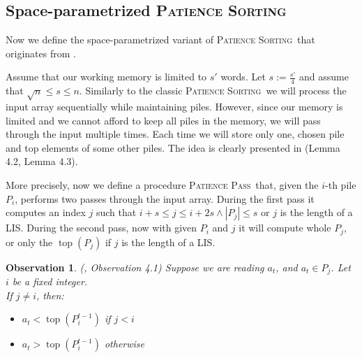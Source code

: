 \documentclass[lic, english, shortabstract]{iithesis}
\theoremstyle{plain}
\newcommand{\Lis}{\textsc{LIS}}
\newcommand{\Psort}{\textsc{Patience Sorting}}
\newcommand{\Ppass}{\textsc{Patience Pass}}
\newtheorem{observation}[theorem]{Observation}
\theoremstyle{definition}
\begin{document}
\subsection{Space-parametrized \Psort}
Now we define the space-parametrized variant of \Psort\ that originates from \cite{kiyomi2017space}.

Assume that our working memory is limited to $s'$ words. Let $s := \frac{s'}{4}$ and assume that $\sqrt{n} \leq s \leq n$.
Similarly to the classic \Psort\ we will process the input array sequentially while maintaining piles. However, since our memory is limited and we cannot afford
to keep all piles in the memory, we will pass through the input multiple times. Each time we will store only one, chosen pile and top elements of some other piles. The idea is clearly presented in \cite{kiyomi2017space} (Lemma 4.2, Lemma 4.3).

More precisely, now we define a procedure \Ppass\ that, given the $i$-th pile $P_i$, performs two passes through the input array.
During the first pass it computes an index $j$ such that $i + s \leq j \leq i + 2s \land |P_j| \leq s$ or $j$ is the length of a \Lis. 
During the second pass, now with given $P_i$ and $j$ it will compute whole $P_j$, or only the $\operatorname{top}(P_j)$ if $j$ is the length of a \Lis.

\begin{observation}\label{obs:filtering} (\cite{kiyomi2017space}, Observation 4.1)
Suppose we are reading $a_t$, and $a_t \in P_j$. Let $i$ be a fixed integer. \\
If $j \neq i$, then:
\begin{itemize}
\item $a_t < \operatorname{top}(P_i^{t-1})$ if $j < i$
\item $a_t > \operatorname{top}(P_i^{t-1})$ otherwise
\end{itemize} 
\end{observation}
\end{document}
